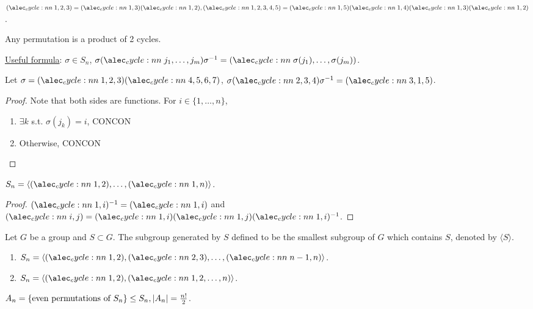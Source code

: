 \begin{example}
  $\cycle{1,2,3} = \cycle{1,3}\cycle{1,2},
  \cycle{1,2,3,4,5} = \cycle{1,5}\cycle{1,4}\cycle{1,3}\cycle{1,2}$.

  Any permutation is a product of 2 cycles.
\end{example}

\underline{Useful formula}: $\sigma \in S_n$,
$\sigma \cycle{j_1, \dots, j_m} \sigma^{-1} =
\cycle{\sigma(j_1),\dots,\sigma(j_m)}$.

\begin{example}
  Let $\sigma = \cycle{1,2,3}\cycle{4,5,6,7}$,
  $\sigma \cycle{2,3,4} \sigma^{-1} = \cycle{3,1,5}$.
\end{example}

\begin{proof}
  Note that both sides are functions. For $i \in \{1,\dots,n\}$,
  \begin{enumerate}
    \item $\exists k$ s.t.  $\sigma(j_k) = i$, CONCON
    \item Otherwise, CONCON
  \end{enumerate}
\end{proof}

\begin{fact}
  $S_n = \langle \cycle{1,2},\dots,\cycle{1,n} \rangle$.
  \begin{proof}
    $\cycle{1,i}^{-1} = \cycle{1,i}$ and
    $\cycle{i,j} = \cycle{1,i}\cycle{1,j}\cycle{1,i}^{-1}$.
  \end{proof}
\end{fact}

\begin{definition}
  Let $G$ be a group and $S \subset G$. The subgroup generated by $S$ defined
  to be the smallest subgroup of $G$ which contains $S$, denoted by
  $\langle S \rangle$.
\end{definition}

\begin{exercise} \mbox{}
  \begin{enumerate}
    \item $S_n = \langle \cycle{1,2},\cycle{2,3},\dots,\cycle{n-1,n} \rangle$.
    \item $S_n = \langle \cycle{1,2},\cycle{1,2,\dots,n} \rangle$.
  \end{enumerate}
\end{exercise}

\begin{definition}
  $A_n = \{ \text{even permutations of $S_n$} \} \le S_n,
  \lvert A_n\rvert = \frac{n!}{2}$.
\end{definition}

